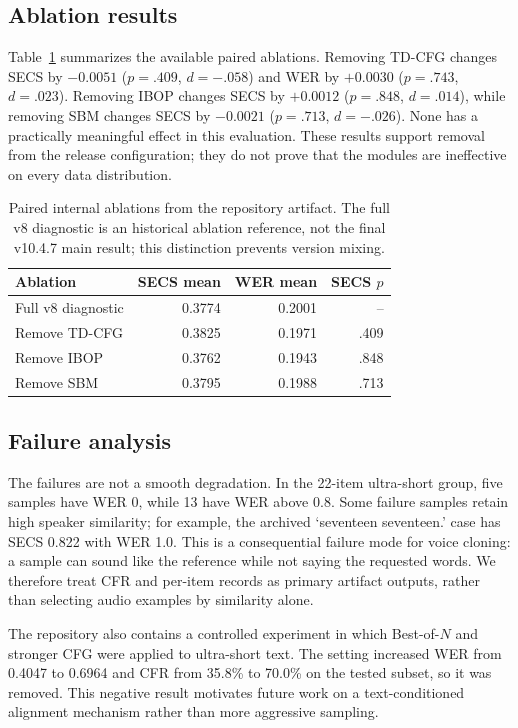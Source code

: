 \documentclass[10pt]{article}
\begin{document}
\subsection{Ablation results}

Table~\ref{tab:ablation} summarizes the available paired ablations. Removing
TD-CFG changes SECS by $-0.0051$ ($p=.409$, $d=-.058$) and WER by $+0.0030$
($p=.743$, $d=.023$). Removing IBOP changes SECS by $+0.0012$ ($p=.848$,
$d=.014$), while removing SBM changes SECS by $-0.0021$ ($p=.713$,
$d=-.026$). None has a practically meaningful effect in this evaluation.
These results support removal from the release configuration; they do not
prove that the modules are ineffective on every data distribution.

\begin{table}[t]
\centering
\small
\begin{tabular}{lrrr}
\toprule
Ablation & SECS mean & WER mean & SECS $p$ \\
\midrule
Full v8 diagnostic & 0.3774 & 0.2001 & -- \\
Remove TD-CFG & 0.3825 & 0.1971 & .409 \\
Remove IBOP & 0.3762 & 0.1943 & .848 \\
Remove SBM & 0.3795 & 0.1988 & .713 \\
\bottomrule
\end{tabular}
\caption{Paired internal ablations from the repository artifact. The full v8
diagnostic is an historical ablation reference, not the final v10.4.7 main
result; this distinction prevents version mixing.}
\label{tab:ablation}
\end{table}

\subsection{Failure analysis}

The failures are not a smooth degradation. In the 22-item ultra-short group,
five samples have WER 0, while 13 have WER above 0.8. Some failure samples
retain high speaker similarity; for example, the archived `seventeen
seventeen.' case has SECS 0.822 with WER 1.0. This is a consequential failure
mode for voice cloning: a sample can sound like the reference while not saying
the requested words. We therefore treat CFR and per-item records as primary
artifact outputs, rather than selecting audio examples by similarity alone.

The repository also contains a controlled experiment in which Best-of-$N$ and
stronger CFG were applied to ultra-short text. The setting increased WER from
0.4047 to 0.6964 and CFR from 35.8\% to 70.0\% on the tested subset, so it was
removed. This negative result motivates future work on a text-conditioned
alignment mechanism rather than more aggressive sampling.
\end{document}
